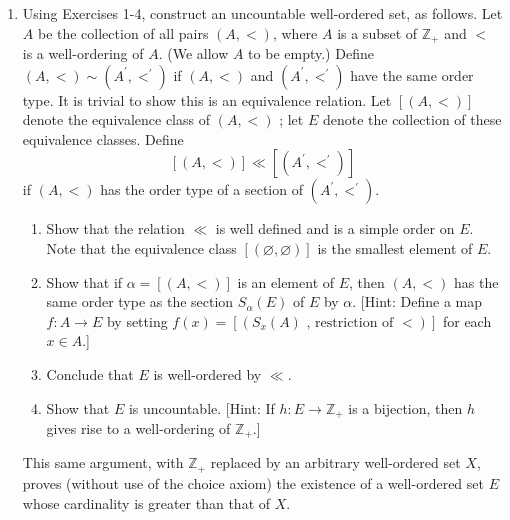 \begin{enumerate}[itemsep=0.4em, parsep=0pt, topsep=0pt, partopsep=0pt, leftmargin=*, label=\arabic*., ref=\arabic*]
\begin{enumerate}[itemsep=0.2em, parsep=0pt, topsep=0pt, partopsep=0pt, leftmargin=*, label=(\alph*), align=left]
  \item If \(({T, < })\) is a tower in \(X\) and \(T \neq X\), show there is a tower in \(X\) of which \(({T, < })\) is a section.
  \item Let \(\{ {({T_{k},{ < }_{k}}) \mid k \in K}\}\) be the collection of all towers in \(X\). Let \[ T = \mathop{\bigcup }\limits_{{k \in K}}T_{k}\;\text{ and }\; < = \mathop{\bigcup }\limits_{{k \in K}}({ < }_{k}). \] Show that \(({T, < })\) is a tower in \(X\). Conclude that \(T = X\).
  \end{enumerate}
\item Using Exercises 1-4, construct an uncountable well-ordered set, as follows. Let \(A\) be the collection of all pairs \(({A, < })\), where \(A\) is a subset of \(\mathbb{Z}_{+}\) and \(<\) is a well-ordering of \(A\). (We allow \(A\) to be empty.) Define \(({A, < }) \sim ({A^{\prime },{ < }^{\prime }})\) if \(({A, < })\) and \(({A^{\prime },{ < }^{\prime }})\) have the same order type. It is trivial to show this is an equivalence relation. Let \([ ({A, < }) ]\) denote the equivalence class of \(({A, < })\) ; let \(E\) denote the collection of these equivalence classes. Define \[ [ ({A, < }) ] \ll [ ({A^{\prime },{ < }^{\prime }}) ] \] if \(({A, < })\) has the order type of a section of \(({A^{\prime },{ < }^{\prime }})\).
  \begin{enumerate}[itemsep=0.2em, parsep=0pt, topsep=0pt, partopsep=0pt, leftmargin=*, label=(\alph*), align=left]
  \item Show that the relation \(\ll\) is well defined and is a simple order on \(E\). Note that the equivalence class \([ ({\varnothing ,\varnothing }) ]\) is the smallest element of \(E\).
  \item Show that if \(\alpha = [ ({A, < }) ]\) is an element of \(E\), then \(({A, < })\) has the same order type as the section \(S_{\alpha }(E)\) of \(E\) by \(\alpha\). [Hint: Define a map \(f : A \rightarrow E\) by setting \(f(x) = [ ({S_{x}(A) \text{ , restriction of } < }) ]\) for each \(x \in A\).]
  \item Conclude that \(E\) is well-ordered by \(\ll\).
  \item Show that \(E\) is uncountable. [Hint: If \(h : E \rightarrow {\mathbb{Z}}_{+}\) is a bijection, then \(h\) gives rise to a well-ordering of \(\mathbb{Z}_{+}\).]
  \end{enumerate}
This same argument, with \(\mathbb{Z}_{+}\) replaced by an arbitrary well-ordered set \(X\), 
proves (without use of the choice axiom) the existence of a well-ordered set \(E\) whose cardinality 
is greater than that of \(X\).


\end{enumerate}

